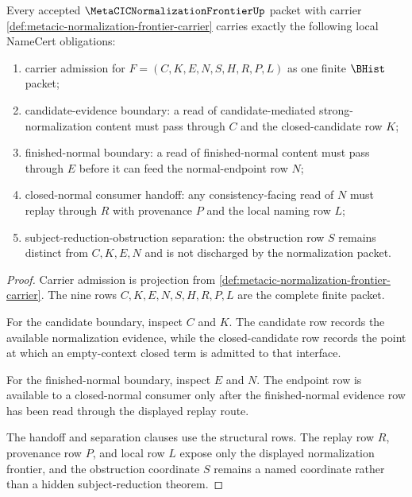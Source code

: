 \begin{theorem}
\label{thm:metacic-normalization-frontier-namecert-obligations}
Every accepted $\MetaCICNormalizationFrontierUp$ packet with carrier \autoref{def:metacic-normalization-frontier-carrier} carries exactly the following local NameCert obligations:
\begin{enumerate}
\item carrier admission for $F=(C,K,E,N,S,H,R,P,L)$ as one finite $\BHist$ packet;
\item candidate-evidence boundary: a read of candidate-mediated strong-normalization content must pass through $C$ and the closed-candidate row $K$;
\item finished-normal boundary: a read of finished-normal content must pass through $E$ before it can feed the normal-endpoint row $N$;
\item closed-normal consumer handoff: any consistency-facing read of $N$ must replay through $R$ with provenance $P$ and the local naming row $L$;
\item subject-reduction-obstruction separation: the obstruction row $S$ remains distinct from $C,K,E,N$ and is not discharged by the normalization packet.
\end{enumerate}
\end{theorem}
\begin{proof}
Carrier admission is projection from \autoref{def:metacic-normalization-frontier-carrier}. The nine rows $C,K,E,N,S,H,R,P,L$ are the complete finite packet.

For the candidate boundary, inspect $C$ and $K$. The candidate row records the available normalization evidence, while the closed-candidate row records the point at which an empty-context closed term is admitted to that interface.

For the finished-normal boundary, inspect $E$ and $N$. The endpoint row is available to a closed-normal consumer only after the finished-normal evidence row has been read through the displayed replay route.

The handoff and separation clauses use the structural rows. The replay row $R$, provenance row $P$, and local row $L$ expose only the displayed normalization frontier, and the obstruction coordinate $S$ remains a named coordinate rather than a hidden subject-reduction theorem.
\end{proof}


